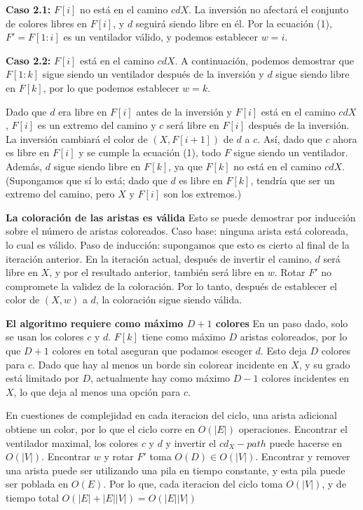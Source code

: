 \documentclass[a4paper]{article}
\begin{document}
\textbf{Caso 2.1:} \( F[i] \) no está en el camino \( cdX \). La inversión no afectará el conjunto de colores libres en \( F[i] \), y \( d \) seguirá siendo libre en él. Por la ecuación (1), \( F' = F[1:i] \) es un ventilador válido, y podemos establecer \( w = i \).

\textbf{Caso 2.2:} \( F[i] \) está en el camino \( cdX \). A continuación, podemos demostrar que \( F[1:k] \) sigue siendo un ventilador después de la inversión y \( d \) sigue siendo libre en \( F[k] \), por lo que podemos establecer \( w = k \).

Dado que \( d \) era libre en \( F[i] \) antes de la inversión y \( F[i] \) está en el camino \( cdX \), \( F[i] \) es un extremo del camino y \( c \) será libre en \( F[i] \) después de la inversión. La inversión cambiará el color de \( (X, F[i+1]) \) de \( d \) a \( c \). Así, dado que \( c \) ahora es libre en \( F[i] \) y se cumple la ecuación (1), todo \( F \) sigue siendo un ventilador. Además, \( d \) sigue siendo libre en \( F[k] \), ya que \( F[k] \) no está en el camino \( cdX \). (Supongamos que sí lo está; dado que \( d \) es libre en \( F[k] \), tendría que ser un extremo del camino, pero \( X \) y \( F[i] \) son los extremos.)

\textbf{La coloración de las aristas es válida}
Esto se puede demostrar por inducción sobre el número de aristas coloreados. Caso base: ninguna arista está coloreada, lo cual es válido. Paso de inducción: supongamos que esto es cierto al final de la iteración anterior. En la iteración actual, después de invertir el camino, \( d \) será libre en \( X \), y por el resultado anterior, también será libre en \( w \). Rotar \( F' \) no compromete la validez de la coloración. Por lo tanto, después de establecer el color de \( (X, w) \) a \( d \), la coloración sigue siendo válida.

\textbf{El algoritmo requiere como máximo \( D + 1 \) colores}
En un paso dado, solo se usan los colores \( c \) y \( d \). \( F[k] \) tiene como máximo \( D \) aristas coloreados, por lo que \( D + 1 \) colores en total aseguran que podamos escoger \( d \). Esto deja \( D \) colores para \( c \). Dado que hay al menos un borde sin colorear incidente en \( X \), y su grado está limitado por \( D \), actualmente hay como máximo \( D - 1 \) colores incidentes en \( X \), lo que deja al menos una opción para \( c \).

En cuestiones de complejidad en cada iteracion del ciclo, una arista adicional obtiene un color, por lo que el ciclo corre en
$O(|E|)$ operaciones. Encontrar el ventilador maximal, los colores $c$ y $d$ y invertir el $cd_X-path$ puede hacerse en $ O(|V|)$. Encontrar $w$ y rotar $F'$ toma $O(D) \in O(|V|)$. Encontrar y remover una arista puede ser utilizando una pila en tiempo constante, y esta pila puede ser poblada en $O(E)$. Por lo que, cada iteracion del ciclo toma $O(|V|)$, y de tiempo total
$O(|E|+|E||V|)=O(|E||V|)$\\
\end{document}
